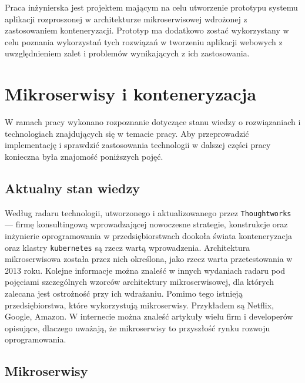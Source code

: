 \documentclass[12pt,twoside]{article}
\begin{document}
Praca inżynierska jest projektem mającym na celu utworzenie prototypu systemu aplikacji rozproszonej w architekturze mikroserwisowej wdrożonej z zastosowaniem konteneryzacji. Prototyp ma dodatkowo zostać wykorzystany w celu poznania wykorzystań tych rozwiązań w tworzeniu aplikacji webowych z uwzględnieniem zalet i problemów wynikających z ich zastosowania.
\clearpage
\section{Mikroserwisy i konteneryzacja}

W ramach pracy wykonano rozpoznanie dotyczące stanu wiedzy o rozwiązaniach i technologiach znajdujących się w temacie pracy. Aby przeprowadzić implementację i sprawdzić zastosowania technologii w dalszej części pracy konieczna była znajomość poniższych pojęć.

\subsection{Aktualny stan wiedzy}

Według radaru technologii, utworzonego i aktualizowanego przez \texttt{Thoughtworks}\cite{thoughtwork} — firmę konsultingową wprowadzającej nowoczesne strategie, konstrukcje oraz inżynierie oprogramowania w przedsiębiorstwach dookoła świata konteneryzacja oraz klastry \texttt{kubernetes} są rzecz wartą wprowadzenia\cite{thdocker,thkubernetes}. Architektura mikroserwisowa została przez nich określona, jako rzecz warta przetestowania w 2013 roku\cite{thservices}. Kolejne informacje można znaleść w innych wydaniach radaru pod pojęciami szczególnych wzorców architektury mikroserwisowej, dla których zalecana jest ostrożność przy ich wdrażaniu\cite{thenvy,thlayered}. Pomimo tego istnieją przedsiębiorstwa, które wykorzystują mikroserwisy. Przykładem są Netflix, Google, Amazon\cite{uses}. W internecie można znaleść artykuły wielu firm i developerów opisujące, dlaczego uważają, że mikroserwisy to przyszłość rynku rozwoju oprogramowania\cite{future,future2,future3,future4}. 


\subsection{Mikroserwisy}
\end{document}
